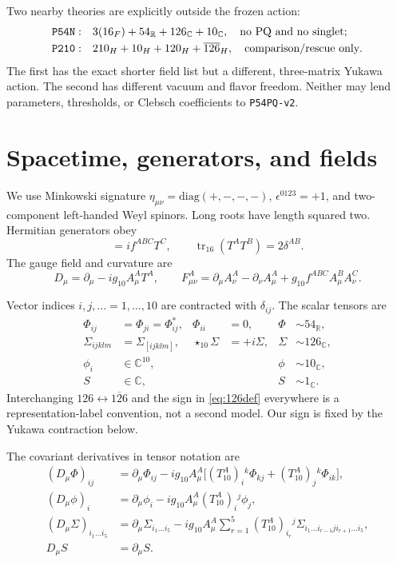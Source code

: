 \documentclass[11pt]{article}
\newcommand{\tr}{\operatorname{tr}}
\begin{document}
Two nearby theories are explicitly outside the frozen action:
\begin{align*}
 \texttt{P54N}:&\quad 3(16_F)+54_{\mathbb R}+126_{\mathbb C}
 +10_{\mathbb C},\quad\hbox{no PQ and no singlet};\\
 \texttt{P210}:&\quad 210_H+10_H+120_H+\overline{126}_H,
 \quad\hbox{comparison/rescue only}.
\end{align*}
The first has the exact shorter field list but a different, three-matrix
Yukawa action.  The second has different vacuum and flavor freedom.  Neither
may lend parameters, thresholds, or Clebsch coefficients to
\texttt{P54PQ-v2}.

\section{Spacetime, generators, and fields}

We use Minkowski signature $\eta_{\mu\nu}=\mathrm{diag}(+,-,-,-)$,
$\epsilon^{0123}=+1$, and two-component left-handed Weyl spinors.  Long roots
have length squared two.  Hermitian generators obey
\begin{equation}
 [T^A,T^B]=i f^{ABC}T^C,\qquad
 \tr_{16}(T^AT^B)=2\delta^{AB}.
 \label{eq:generator-normalization}
\end{equation}
The gauge field and curvature are
\begin{equation}
 D_\mu=\partial_\mu-i g_{10}A_\mu^AT^A,\qquad
 F_{\mu\nu}^A=\partial_\mu A_\nu^A-\partial_\nu A_\mu^A
 +g_{10}f^{ABC}A_\mu^BA_\nu^C.
\end{equation}

Vector indices $i,j,\ldots=1,\ldots,10$ are contracted with $\delta_{ij}$.
The scalar tensors are
\begin{align}
 \Phi_{ij}&=\Phi_{ji}=\Phi_{ij}^*,& \Phi_{ii}&=0,
 &\Phi&\sim54_{\mathbb R},\label{eq:54def}\\
 \Sigma_{ijklm}&=\Sigma_{[ijklm]},& \star_{10}\Sigma&=+i\Sigma,
 &\Sigma&\sim126_{\mathbb C},\label{eq:126def}\\
 \phi_i&\in\mathbb C^{10},&&&\phi&\sim10_{\mathbb C},\\
 S&\in\mathbb C,&&&S&\sim1_{\mathbb C}.
\end{align}
Interchanging $126\leftrightarrow\overline{126}$ and the sign in
\eqref{eq:126def} everywhere is a representation-label convention, not a
second model.  Our sign is fixed by the Yukawa contraction below.

The covariant derivatives in tensor notation are
\begin{align}
 (D_\mu\Phi)_{ij}&=\partial_\mu\Phi_{ij}
 -ig_{10}A_\mu^A\big[(T^A_{10})_i{}^k\Phi_{kj}
 +(T^A_{10})_j{}^k\Phi_{ik}\big],\\
 (D_\mu\phi)_i&=\partial_\mu\phi_i
 -ig_{10}A_\mu^A(T^A_{10})_i{}^j\phi_j,\\
 (D_\mu\Sigma)_{i_1\ldots i_5}&=\partial_\mu\Sigma_{i_1\ldots i_5}
 -ig_{10}A_\mu^A\sum_{r=1}^5(T^A_{10})_{i_r}{}^j
 \Sigma_{i_1\ldots i_{r-1}j i_{r+1}\ldots i_5},\\
 D_\mu S&=\partial_\mu S.
\end{align}
\end{document}
